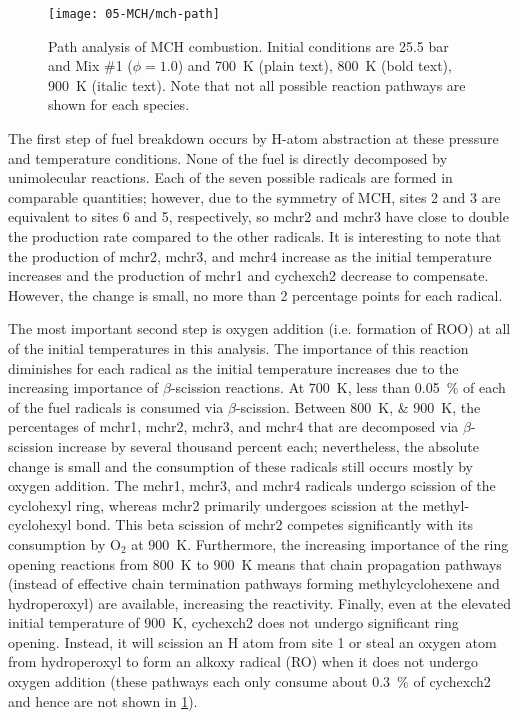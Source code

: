 \documentclass[../main.tex]{subfiles}
\begin{document}
\begin{figure}
    \texttt{[image: 05-MCH/mch-path]}
    \caption{Path analysis of MCH combustion. Initial conditions are 25.5 bar
    and Mix \#1 ($\phi=\num{1.0}$) and \SI{700}{\kelvin} (plain text),
    \SI{800}{\kelvin} (bold text), \SI{900}{\kelvin} (italic text).
    Note that not all possible reaction pathways are shown for
    each species.}
    \label{fig:mch-path}
\end{figure}

The first step of fuel breakdown occurs by H-atom abstraction at these pressure
and temperature conditions. None of the fuel is directly decomposed by
unimolecular reactions. Each of the seven possible radicals are formed in
comparable quantities; however, due to the symmetry of MCH, sites 2 and 3 are
equivalent to sites 6 and 5, respectively, so mchr2 and mchr3 have close to
double the production rate compared to the other radicals. It is interesting to
note that the production of mchr2, mchr3, and mchr4 increase as the initial
temperature increases and the production of mchr1 and cychexch2 decrease to
compensate. However, the change is small, no more than 2 percentage points for
each radical.

The most important second step is oxygen addition (i.e. formation of ROO) at
all of the initial temperatures in this analysis. The importance of this
reaction diminishes for each radical as the initial temperature increases due
to the increasing importance of $\beta$-scission reactions. At \SI{700}{\kelvin}, less than
\SI{0.05}{\percent} of each of the fuel radicals is consumed via $\beta$-scission. Between
\SIlist{800;900}{\kelvin}, the percentages of mchr1, mchr2, mchr3, and mchr4 that are decomposed
via $\beta$-scission increase by several thousand percent each; nevertheless,
the absolute change is small and the consumption of these radicals still occurs
mostly by oxygen addition. The mchr1, mchr3, and mchr4 radicals undergo
scission of the cyclohexyl ring, whereas mchr2 primarily undergoes scission at the
methyl-cyclohexyl bond. This beta scission of mchr2 competes significantly with
its consumption by O$_2$ at \SI{900}{\kelvin}. Furthermore, the increasing importance of the
ring opening reactions from \SI{800}{\kelvin} to \SI{900}{\kelvin} means that chain propagation pathways
(instead of effective chain termination pathways forming methylcyclohexene and
hydroperoxyl) are available, increasing the reactivity. Finally, even at the
elevated initial temperature of \SI{900}{\kelvin}, cychexch2 does not undergo significant
ring opening. Instead, it will scission an H atom from site 1 or steal an oxygen
atom from hydroperoxyl to form an alkoxy radical (RO) when it does not undergo
oxygen addition (these pathways each only consume about \SI{0.3}{\percent} of cychexch2 and
hence are not shown in \cref{fig:mch-path}).
\end{document}
